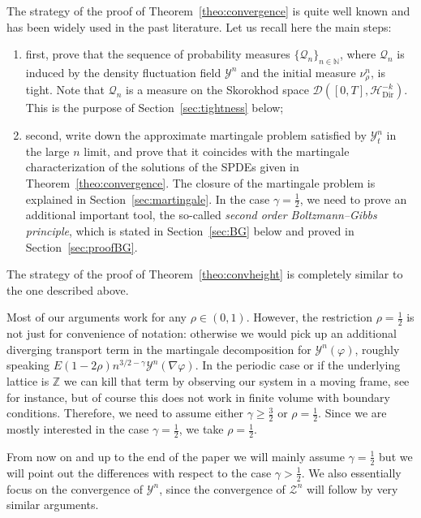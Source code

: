 \documentclass[AHL,Unicode,longabstracts]{cedram}
\newcommand{\bb}[1]{{\mathbb #1}}
\newcommand{\mc}[1]{{\mathcal #1}}
\renewcommand{\mc}[1]{{\mathcal #1}}
\renewcommand{\ge}{\geqslant}
\renewcommand{\tfrac}{\frac}
\begin{document}
The strategy of the proof of Theorem~\ref{theo:convergence} is quite well known and has been widely used in the past literature. Let us recall here the main steps:
\begin{enumerate}
\item first, prove that the sequence of probability measures $\{\mc Q_n\}_{n\in\bb N}$, where $\mc Q_n$ is induced by the density fluctuation field $\mc Y^n$ and the initial measure $\nu^n_\rho$, is tight. Note that $\mc Q_n$ is a measure on the Skorokhod space $\mc D([0,T],\mc H_{\mathrm{Dir}}^{-k})$. This is the purpose of Section~\ref{sec:tightness} below;
\item second, write down the approximate martingale problem satisfied by $\mc Y_t^n$ in the large $n$ limit, and prove that it coincides with the martingale characterization of the solutions of the SPDEs given in Theorem~\ref{theo:convergence}. The closure of the martingale problem is explained in Section~\ref{sec:martingale}. In the case $\gamma=\frac12$, we need to prove an additional important tool, the so-called \emph{second order Boltzmann--Gibbs principle}, which is stated in Section~\ref{sec:BG} below and proved in Section~\ref{sec:proofBG}.
\end{enumerate}

The strategy of the proof of Theorem~\ref{theo:convheight} is completely similar to the one described above.



\begin{rema}\label{rem:rho}
Most of our arguments work for any $\rho \in (0,1)$. However, the restriction $\rho=\tfrac12$ is not just for convenience of notation: otherwise we would pick up an additional diverging transport term in the martingale decomposition for $\mc Y^n(\varphi)$, roughly speaking $E(1-2\rho)n^{3/2-\gamma} \mc Y^n(\nabla\varphi)$. In the periodic case or if the underlying lattice is $\bb Z$ we can kill that term by observing our system in a moving frame, see~\cite{gj2014} for instance, but of course this does not work in finite volume with boundary conditions. Therefore, we need to assume either $\gamma \ge \tfrac32$ or $\rho=\tfrac12$. Since we are mostly interested in the case $\gamma = \tfrac12$, we take $\rho=\tfrac12$.
\end{rema}


From now on and up to the end of the paper we will mainly assume $\gamma=\frac12$ but we will point out the differences with respect to the case $\gamma>\frac12$. We also essentially focus on the convergence of $\mc Y^n$, since the convergence of $\mc Z^n$ will follow by very similar arguments.
\end{document}
